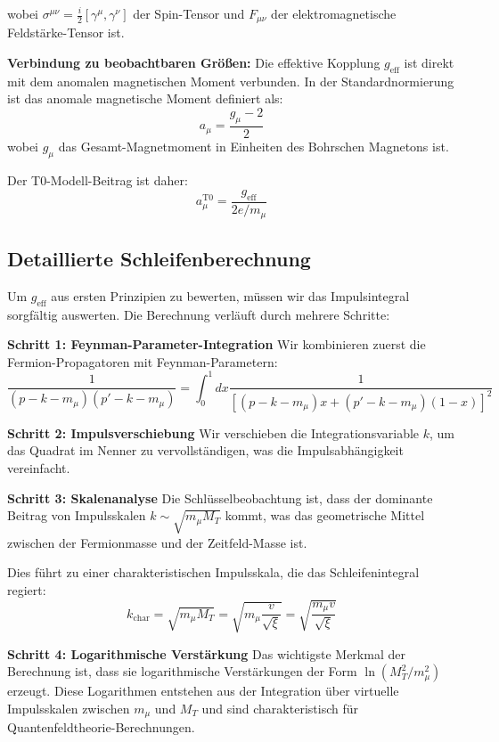 \documentclass[12pt,a4paper]{article}
\newcommand{\xigeom}{\xi}
\begin{document}
	wobei $\sigma^{\mu\nu} = \frac{i}{2}[\gamma^\mu, \gamma^\nu]$ der Spin-Tensor und $F_{\mu\nu}$ der elektromagnetische Feldstärke-Tensor ist.
	
	\textbf{Verbindung zu beobachtbaren Größen:} Die effektive Kopplung $g_{\text{eff}}$ ist direkt mit dem anomalen magnetischen Moment verbunden. In der Standardnormierung ist das anomale magnetische Moment definiert als:
	\begin{equation}
		a_\mu = \frac{g_\mu - 2}{2}
	\end{equation}
	wobei $g_\mu$ das Gesamt-Magnetmoment in Einheiten des Bohrschen Magnetons ist.
	
	Der T0-Modell-Beitrag ist daher:
	\begin{equation}
		a_\mu^{\text{T0}} = \frac{g_{\text{eff}}}{2e/m_\mu}
	\end{equation}
	
	\subsection{Detaillierte Schleifenberechnung}
	
	Um $g_{\text{eff}}$ aus ersten Prinzipien zu bewerten, müssen wir das Impulsintegral sorgfältig auswerten. Die Berechnung verläuft durch mehrere Schritte:
	
	\textbf{Schritt 1: Feynman-Parameter-Integration}
	Wir kombinieren zuerst die Fermion-Propagatoren mit Feynman-Parametern:
	\begin{equation}
		\frac{1}{(p-k-m_\mu)(p'-k-m_\mu)} = \int_0^1 dx \frac{1}{[(p-k-m_\mu)x + (p'-k-m_\mu)(1-x)]^2}
	\end{equation}
	
	\textbf{Schritt 2: Impulsverschiebung}
	Wir verschieben die Integrationsvariable $k$, um das Quadrat im Nenner zu vervollständigen, was die Impulsabhängigkeit vereinfacht.
	
	\textbf{Schritt 3: Skalenanalyse}
	Die Schlüsselbeobachtung ist, dass der dominante Beitrag von Impulsskalen $k \sim \sqrt{m_\mu M_T}$ kommt, was das geometrische Mittel zwischen der Fermionmasse und der Zeitfeld-Masse ist.
	
	Dies führt zu einer charakteristischen Impulsskala, die das Schleifenintegral regiert:
	\begin{equation}
		k_{\text{char}} = \sqrt{m_\mu M_T} = \sqrt{m_\mu \frac{v}{\sqrt{\xigeom}}} = \sqrt{\frac{m_\mu v}{\sqrt{\xigeom}}}
	\end{equation}
	
	\textbf{Schritt 4: Logarithmische Verstärkung}
	Das wichtigste Merkmal der Berechnung ist, dass sie logarithmische Verstärkungen der Form $\ln(M_T^2/m_\mu^2)$ erzeugt. Diese Logarithmen entstehen aus der Integration über virtuelle Impulsskalen zwischen $m_\mu$ und $M_T$ und sind charakteristisch für Quantenfeldtheorie-Berechnungen.
	
\end{document}
